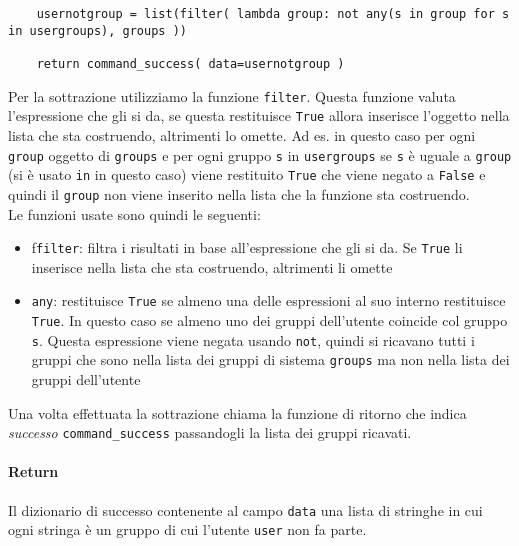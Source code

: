 \documentclass[11pt]{article}
\begin{document}
\begin{lstlisting}
    usernotgroup = list(filter( lambda group: not any(s in group for s in usergroups), groups ))

    return command_success( data=usernotgroup )
\end{lstlisting}
Per la sottrazione utilizziamo la funzione \texttt{filter}. Questa funzione valuta l'espressione che gli si da,
se questa restituisce \texttt{True} allora inserisce l'oggetto nella lista che sta costruendo, altrimenti lo omette.
Ad es. in questo caso per ogni \texttt{group} oggetto di \texttt{groups} e per ogni gruppo \texttt{s} in \texttt{usergroups}
se \texttt{s} è uguale a \texttt{group} (si è usato \texttt{in} in questo caso) viene restituito \texttt{True}
che viene negato a \texttt{False} e quindi il \texttt{group} non viene inserito nella lista che la funzione sta costruendo.\\
Le funzioni usate sono quindi le seguenti:
\begin{itemize}
	\item{f\texttt{filter}: filtra i risultati in base all'espressione che gli si da. Se \texttt{True} li inserisce nella lista
		che sta costruendo, altrimenti li omette}
	\item{\texttt{any}: restituisce \texttt{True} se almeno una delle espressioni al suo interno restituisce \texttt{True}. 
		In questo caso se almeno uno dei gruppi dell'utente coincide col gruppo \texttt{s}. Questa espressione viene negata
		usando \texttt{not}, quindi si ricavano tutti i gruppi che sono nella lista dei gruppi di sistema \texttt{groups}
		ma non nella lista dei gruppi dell'utente}
\end{itemize}
Una volta effettuata la sottrazione chiama la funzione di ritorno che indica \textit{successo} \texttt{command\_success}
passandogli la lista dei gruppi ricavati.
\paragraph{Return}
Il dizionario di successo contenente al campo \texttt{data} una lista di stringhe in cui ogni stringa è un gruppo
di cui l'utente \texttt{user} non fa parte.
\end{document}
